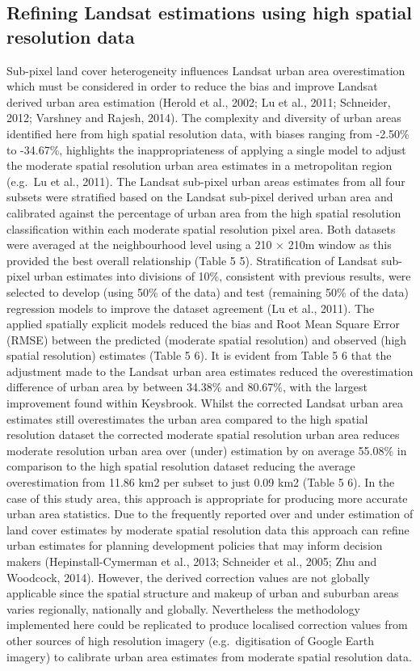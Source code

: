 \documentclass[]{book}
\begin{document}
\subsection{Refining Landsat estimations using high spatial resolution
data}\label{refining-landsat-estimations-using-high-spatial-resolution-data}

Sub-pixel land cover heterogeneity influences Landsat urban area
overestimation which must be considered in order to reduce the bias and
improve Landsat derived urban area estimation (Herold et al., 2002; Lu
et al., 2011; Schneider, 2012; Varshney and Rajesh, 2014). The
complexity and diversity of urban areas identified here from high
spatial resolution data, with biases ranging from -2.50\% to -34.67\%,
highlights the inappropriateness of applying a single model to adjust
the moderate spatial resolution urban area estimates in a metropolitan
region (e.g.~Lu et al., 2011). The Landsat sub-pixel urban areas
estimates from all four subsets were stratified based on the Landsat
sub-pixel derived urban area and calibrated against the percentage of
urban area from the high spatial resolution classification within each
moderate spatial resolution pixel area. Both datasets were averaged at
the neighbourhood level using a 210 × 210m window as this provided the
best overall relationship (Table 5 5). Stratification of Landsat
sub-pixel urban estimates into divisions of 10\%, consistent with
previous results, were selected to develop (using 50\% of the data) and
test (remaining 50\% of the data) regression models to improve the
dataset agreement (Lu et al., 2011). The applied spatially explicit
models reduced the bias and Root Mean Square Error (RMSE) between the
predicted (moderate spatial resolution) and observed (high spatial
resolution) estimates (Table 5 6). It is evident from Table 5 6 that the
adjustment made to the Landsat urban area estimates reduced the
overestimation difference of urban area by between 34.38\% and 80.67\%,
with the largest improvement found within Keysbrook. Whilst the
corrected Landsat urban area estimates still overestimates the urban
area compared to the high spatial resolution dataset the corrected
moderate spatial resolution urban area reduces moderate resolution urban
area over (under) estimation by on average 55.08\% in comparison to the
high spatial resolution dataset reducing the average overestimation from
11.86 km2 per subset to just 0.09 km2 (Table 5 6). In the case of this
study area, this approach is appropriate for producing more accurate
urban area statistics. Due to the frequently reported over and under
estimation of land cover estimates by moderate spatial resolution data
this approach can refine urban estimates for planning development
policies that may inform decision makers (Hepinstall-Cymerman et al.,
2013; Schneider et al., 2005; Zhu and Woodcock, 2014). However, the
derived correction values are not globally applicable since the spatial
structure and makeup of urban and suburban areas varies regionally,
nationally and globally. Nevertheless the methodology implemented here
could be replicated to produce localised correction values from other
sources of high resolution imagery (e.g.~digitisation of Google Earth
imagery) to calibrate urban area estimates from moderate spatial
resolution data.
\end{document}
